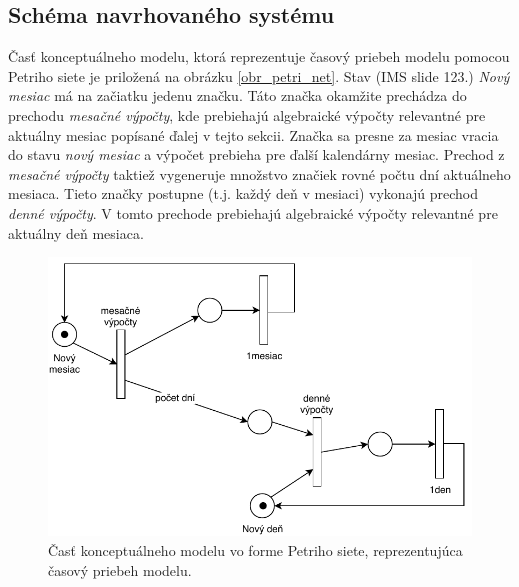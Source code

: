 \documentclass[a4paper, 11pt]{article}
\begin{document}
\subsection{Schéma navrhovaného systému} \label{petri_net_section}
Časť konceptuálneho modelu, ktorá reprezentuje časový priebeh modelu pomocou Petriho siete je priložená na obrázku \ref{obr_petri_net}. Stav (IMS\cite{ims_slides} slide 123.)  \textit{Nový mesiac} má na začiatku jedenu značku. Táto značka okamžite prechádza do prechodu \textit{mesačné výpočty}, kde prebiehajú algebraické výpočty relevantné pre aktuálny mesiac popísané ďalej v tejto sekcii. Značka sa presne za mesiac vracia do stavu \textit{nový mesiac} a výpočet prebieha pre ďalší kalendárny mesiac. Prechod z \textit{mesačné výpočty} taktiež vygeneruje množstvo značiek rovné počtu dní aktuálneho mesiaca. Tieto značky postupne (t.j. každý deň v mesiaci) vykonajú prechod \textit{denné výpočty}. V tomto prechode prebiehajú algebraické výpočty relevantné pre aktuálny deň mesiaca.

\begin{figure}[H] 
	\centering
	\includegraphics[width=.6\paperwidth]{images/petri_net.pdf}
	\caption{Časť konceptuálneho modelu vo forme Petriho siete, reprezentujúca časový priebeh modelu.}
\end{figure} \label{obr_petri_net}
\end{document}
